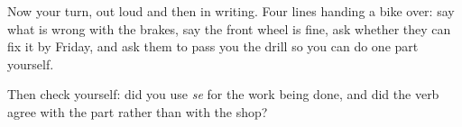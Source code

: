 \begin{tcolorbox}[breakable,colback=teal!4,colframe=teal!35!black,title={Before you move on}]
Now your turn, out loud and then in writing. Four lines handing a bike over: say what is wrong with the brakes, say the front wheel is fine, ask whether they can fix it by Friday, and ask them to pass you the drill so you can do one part yourself.

Then check yourself: did you use \emph{se} for the work being done, and did the verb agree with the part rather than with the shop?
\end{tcolorbox}
